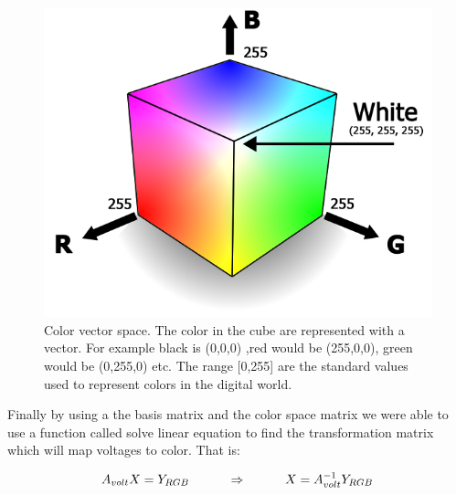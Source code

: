 \documentclass[paper=letter, fontsize=12pt]{article}
\begin{document}
\begin{figure} [H]
\centering
\includegraphics[scale=.2]{color_cube.png}
\caption{Color vector space. The color in the cube are represented with a vector. For example black is (0,0,0) ,red would be (255,0,0), green would be (0,255,0) etc. The range [0,255] are the standard values used to represent colors in the digital world.}
\label{color_cube}
\end{figure}



Finally by using a the basis matrix and the color space matrix we were able to use a function called solve linear equation to find the transformation matrix which will map voltages to color. That is:

\begin{equation}\label{transformation}
A_{volt}X = Y_{RGB}\indent\indent \Rightarrow\indent\indent X = A_{volt}^{-1}Y_{RGB}
\end{equation}
\end{document}

